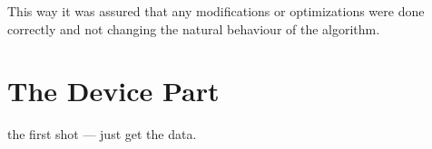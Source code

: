 This way it was assured that any modifications or optimizations were done 
correctly and not changing the natural behaviour of the algorithm. 

\section{The Device Part} %
\label{sec:the_device}

the first shot --- just get the data.

